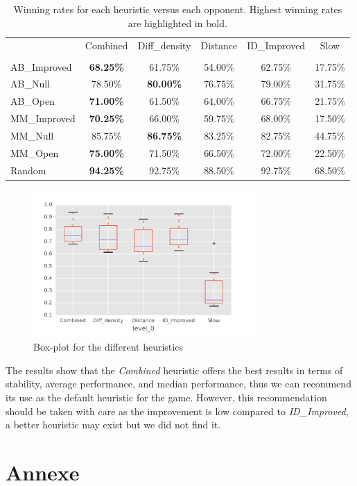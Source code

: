\documentclass{article}
\begin{document}
\begin{table}
    \centering
\begin{tabular}{lccccc}
\toprule
 & Combined & Diff\_density & Distance & ID\_Improved &   Slow \\
        &          &              &          &             &        \\
\midrule
    AB\_Improved &   \bf{68.25\%} &       61.75\% &   54.00\% &      62.75\% & 17.75\% \\
    AB\_Null     &   78.50\% &       \bf{80.00\%} &   76.75\% &      79.00\% & 31.75\% \\
    AB\_Open     &   \bf{71.00\%} &       61.50\% &   64.00\% &      66.75\% & 21.75\% \\
    MM\_Improved &   \bf{70.25\%} &       66.00\% &   59.75\% &      68.00\% & 17.50\% \\
    MM\_Null     &   85.75\% &       \bf{86.75\%} &   83.25\% &      82.75\% & 44.75\% \\
    MM\_Open     &   \bf{75.00\%} &       71.50\% &   66.50\% &      72.00\% & 22.50\% \\
    Random      &   \bf{94.25\%} &       92.75\% &   88.50\% &      92.75\% & 68.50\% \\
\bottomrule
\end{tabular}
    \caption{Winning rates for each heuristic versus each opponent. Highest winning rates are highlighted in bold. \label{table:detail_percentage}}

\end{table}

\begin{figure}[h]
    \centering
    \includegraphics[width=0.75\textwidth]{boxplot.pdf}
    \caption{Box-plot for the different heuristics \label{fig:boxplot}}
\end{figure}

The results show that the \emph{Combined} heuristic offers the best results in terms of stability, average performance, and median performance, thus we can recommend its use as the default heuristic for the game. However, this recommendation should be taken with care as the improvement is low compared to \emph{ID\_Improved}, a better heuristic may exist but we did not find it.

\newpage
\section{Annexe}
\label{annexe1}

\end{document}

